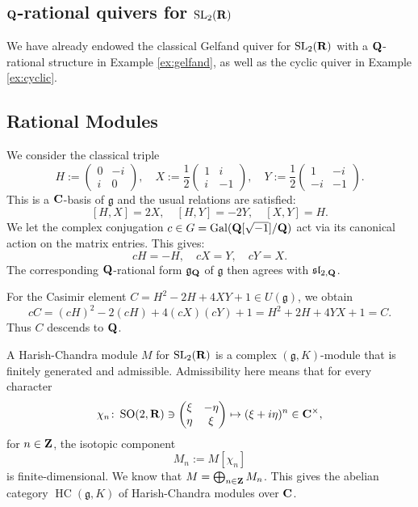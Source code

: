 \documentclass[a4paper,12pt,reqno]{amsart}
\newcommand{\CC}{{\rm\bf C}}
\newcommand{\RR}{{\rm\bf R}}
\newcommand{\QQ}{{\rm\bf Q}}
\newcommand{\ZZ}{{\rm\bf Z}}
\DeclareMathOperator{\SL}{\mathrm{SL}}
\DeclareMathOperator{\SO}{\mathrm{SO}}
\DeclareMathOperator{\Gal}{\mathrm {Gal}}
\DeclareMathOperator{\HC}{\mathrm{HC}}
\theoremstyle{plain}
\theoremstyle{remark}
\begin{document}
\subsection{$\QQ$-rational quivers for $\SL_2(\RR)$}
  
  We have already endowed the classical Gelfand quiver for $\SL_2(\RR)$ with a $\QQ$-rational structure in Example \ref{ex:gelfand}, as well as the cyclic quiver in Example \ref{ex:cyclic}.

\subsection{Rational Modules}

  We consider the classical triple
  \[
  H:=\begin{pmatrix} 0 & -i \\ i & 0 \end{pmatrix}, \quad
  X:=\frac{1}{2}\begin{pmatrix} 1 & i \\ i & -1 \end{pmatrix}, \quad
  Y:=\frac{1}{2}\begin{pmatrix} 1 & -i \\ -i & -1 \end{pmatrix}.
  \]
  This is a $\CC$-basis of $\mathfrak{g}$ and the usual relations are satisfied:
  \[
    [H, X] = 2X, \quad [H, Y] = -2Y, \quad [X, Y] = H.
  \]
  We let the complex conjugation $c \in G = \Gal(\QQ[\sqrt{-1}]/\QQ)$ act via its canonical action on the matrix entries. This gives:
  \[
  cH = -H, \quad cX = Y, \quad cY = X.
  \]
  The corresponding $\QQ$-rational form $\mathfrak{g}_\QQ$ of $\mathfrak{g}$ then agrees with $\mathfrak{sl}_{2,\QQ}$.
  
  For the Casimir element $C = H^2 - 2H + 4XY + 1 \in U(\mathfrak{g})$, we obtain
  \[
  cC = (cH)^2 - 2(cH) + 4(cX)(cY) + 1 = H^2 + 2H + 4YX + 1 = C.
  \]
  Thus $C$ descends to $\QQ$.
  
  A Harish-Chandra module $M$ for $\SL_2(\RR)$ is a complex $(\mathfrak{g}, K)$-module that is finitely generated and admissible. Admissibility here means that for every character
  \[
  \chi_n\colon \SO(2, \RR) \ni \begin{pmatrix} \xi & -\eta \\ \eta & \xi \end{pmatrix} \mapsto (\xi+i\eta)^n \in \CC^\times,
  \]
  for $n \in \ZZ$, the isotopic component
  \[
  M_n := M[\chi_n]
  \]
  is finite-dimensional. We know that $M = \bigoplus_{n\in\ZZ} M_n$. This gives the abelian category $\HC(\mathfrak{g}, K)$ of Harish-Chandra modules over $\CC$.
  
\end{document}
